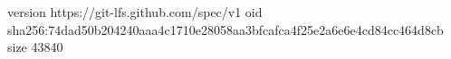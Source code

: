 version https://git-lfs.github.com/spec/v1
oid sha256:74dad50b204240aaa4c1710e28058aa3bfcafca4f25e2a6e6e4cd84cc464d8cb
size 43840
